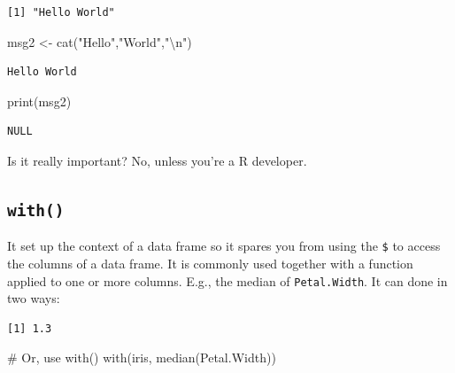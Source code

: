 \documentclass[
  letterpaper,
]{book}
\newenvironment{Shaded}{\begin{snugshade}}{\end{snugshade}}
\newcommand{\CommentTok}[1]{\textcolor[rgb]{0.37,0.37,0.37}{#1}}
\newcommand{\FunctionTok}[1]{\textcolor[rgb]{0.28,0.35,0.67}{#1}}
\newcommand{\NormalTok}[1]{\textcolor[rgb]{0.00,0.23,0.31}{#1}}
\newcommand{\OtherTok}[1]{\textcolor[rgb]{0.00,0.23,0.31}{#1}}
\newcommand{\SpecialCharTok}[1]{\textcolor[rgb]{0.37,0.37,0.37}{#1}}
\newcommand{\StringTok}[1]{\textcolor[rgb]{0.13,0.47,0.30}{#1}}
\begin{document}
\begin{verbatim}
[1] "Hello World"
\end{verbatim}

\begin{Shaded}
\begin{Highlighting}[]
\NormalTok{msg2 }\OtherTok{\textless{}{-}} \FunctionTok{cat}\NormalTok{(}\StringTok{"Hello"}\NormalTok{,}\StringTok{"World"}\NormalTok{,}\StringTok{"}\SpecialCharTok{\textbackslash{}n}\StringTok{"}\NormalTok{)}
\end{Highlighting}
\end{Shaded}

\begin{verbatim}
Hello World 
\end{verbatim}

\begin{Shaded}
\begin{Highlighting}[]
\FunctionTok{print}\NormalTok{(msg2)}
\end{Highlighting}
\end{Shaded}

\begin{verbatim}
NULL
\end{verbatim}

Is it really important? No, unless you're a R developer.

\subsection*{\texorpdfstring{\texttt{with()}}{with()}}\label{with}

It set up the context of a data frame so it spares you from using the
\texttt{\$} to access the columns of a data frame. It is commonly used
together with a function applied to one or more columns. E.g., the
median of \texttt{Petal.Width}. It can done in two ways:

\begin{Shaded}
\end{Shaded}

\begin{verbatim}
[1] 1.3
\end{verbatim}

\begin{Shaded}
\begin{Highlighting}[]
\CommentTok{\# Or, use with()}
\FunctionTok{with}\NormalTok{(iris, }\FunctionTok{median}\NormalTok{(Petal.Width))}
\end{Highlighting}
\end{Shaded}
\end{document}
